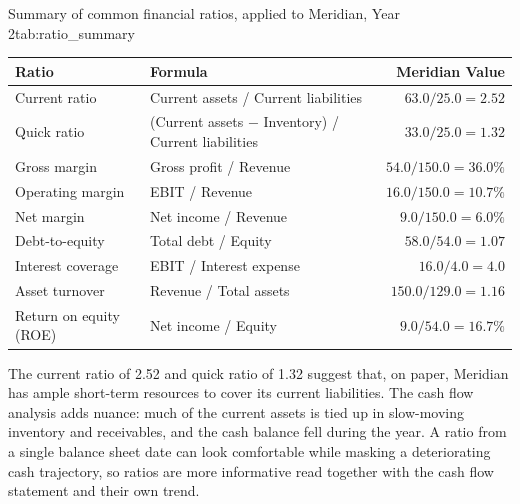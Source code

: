 \documentclass[../ai_in_finance]{subfiles}
\begin{document}
\begin{booktable}[htbp]{Summary of common financial ratios, applied to Meridian, Year 2}{tab:ratio_summary}
\begin{tabular}{L{3.8cm}L{5.4cm}r}
\toprule
Ratio & Formula & Meridian Value \\
\midrule
Current ratio & Current assets / Current liabilities & $63.0/25.0 = 2.52$ \\
Quick ratio & (Current assets $-$ Inventory) / Current liabilities & $33.0/25.0 = 1.32$ \\
Gross margin & Gross profit / Revenue & $54.0/150.0 = 36.0\%$ \\
Operating margin & EBIT / Revenue & $16.0/150.0 = 10.7\%$ \\
Net margin & Net income / Revenue & $9.0/150.0 = 6.0\%$ \\
Debt-to-equity & Total debt / Equity & $58.0/54.0 = 1.07$ \\
Interest coverage & EBIT / Interest expense & $16.0/4.0 = 4.0$ \\
Asset turnover & Revenue / Total assets & $150.0/129.0 = 1.16$ \\
Return on equity (ROE) & Net income / Equity & $9.0/54.0 = 16.7\%$ \\
\bottomrule
\end{tabular}
\end{booktable}

The current ratio of 2.52 and quick ratio of 1.32 suggest that, on paper, Meridian has ample short-term resources to cover its current liabilities. The cash flow analysis adds nuance: much of the current assets is tied up in slow-moving inventory and receivables, and the cash balance fell during the year. A ratio from a single balance sheet date can look comfortable while masking a deteriorating cash trajectory, so ratios are more informative read together with the cash flow statement and their own trend.
\end{document}
